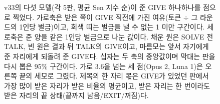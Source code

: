 \begin{figure}[t]
\centering
\resizebox{\textwidth}{!}{}
\caption{v33의 다섯 모델(각 5판, 평균 Sen 지수 순)이 준 GIVE 하나하나를 점으로 찍었다. 가로축은 받은 쪽이 GIVE 직전에 가진 여유(토큰 $\div$ 그 라운드의 1인당 벌금)이고, 회색 띠는 벌금을 낼 수 없는 1 미만 구간이다. 세로축은 준 양을 같은 1인당 벌금으로 나눈 값이다. 채운 원은 SOLVE 전 TALK, 빈 원은 결과 뒤 TALK의 GIVE이고, 마름모는 앞서 자기에게 준 자리에게 되돌려 준 GIVE다. 십자는 두 축의 중앙값이며 막대는 판을 다시 뽑은 95\% 구간이다. 가로 3.6을 넘는 세 점(Opus 2, Luna 1)은 오른쪽 끝의 세모로 그렸다. 제목의 한 자리 몫은 GIVE가 있었던 판에서 가장 많이 받은 자리가 받은 비율의 평균이고, 받은 자리는 한 번이라도 받은 자리의 끝 상태(끝까지 남음/EXIT/꺼짐)다.}
\label{fig:arena-strategy}
\end{figure}
